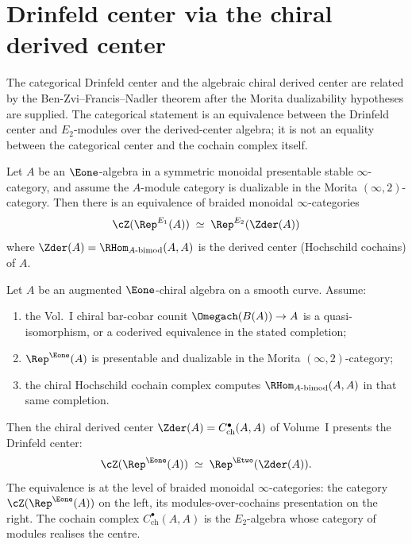 \section{Drinfeld center via the chiral derived center}
\label{sec:drinfeld-chiral-center}

The categorical Drinfeld center and the algebraic chiral derived center
are related by the Ben-Zvi--Francis--Nadler theorem after the Morita
dualizability hypotheses are supplied.  The categorical statement is
an equivalence between the Drinfeld center and \(E_2\)-modules over
the derived-center algebra; it is not an equality between the
categorical center and the cochain complex itself.

\begin{theorem}
\label{thm:bzfn}
Let $A$ be an $\Eone$-algebra in a symmetric monoidal presentable
stable $\infty$-category, and assume the $A$-module category is
dualizable in the Morita $(\infty,2)$-category. Then there is an
equivalence of braided monoidal $\infty$-categories
\[
 \cZ(\Rep^{E_1}(A))
 \;\simeq\;
 \Rep^{E_2}(\Zder(A))
\]
where $\Zder(A) = \RHom_{A\text{-}\mathrm{bimod}}(A, A)$ is the
derived center (Hochschild cochains) of $A$.
\end{theorem}

\begin{corollary}
\label{cor:zder-drinfeld}
Let $A$ be an augmented $\Eone$-chiral algebra on a smooth curve.
Assume:
\begin{enumerate}[label=\textup{(\roman*)}]
 \item the Vol.~I chiral bar-cobar counit
 $\Omegach(B(A))\to A$ is a quasi-isomorphism, or a coderived
 equivalence in the stated completion;
 \item $\Rep^{\Eone}(A)$ is presentable and dualizable in the Morita
 $(\infty,2)$-category;
 \item the chiral Hochschild cochain complex computes
 $\RHom_{A\text{-}\mathrm{bimod}}(A,A)$ in that same completion.
\end{enumerate}
Then the chiral derived center
$\Zder(A) = C^\bullet_{\mathrm{ch}}(A, A)$ of Volume~I presents the
Drinfeld center:
\[
 \cZ(\Rep^{\Eone}(A)) \;\simeq\; \Rep^{\Etwo}(\Zder(A)).
\]
The equivalence is at the level of braided monoidal $\infty$-categories:
the category $\cZ(\Rep^{\Eone}(A))$ on the left, its modules-over-cochains
presentation on the right. The cochain complex
$C^\bullet_{\mathrm{ch}}(A, A)$ is the $E_2$-algebra whose category of
modules realises the centre.
\end{corollary}

